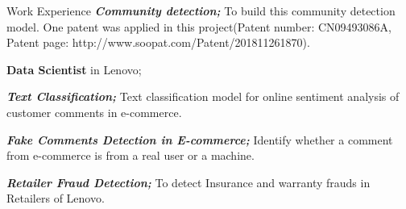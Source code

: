 \begin{rubric}{Work Experience}
    \textbf{\textit{Community detection;}} 
To build this community detection model.
One patent was applied in this project(Patent number: CN09493086A, Patent page: http://www.soopat.com/Patent/201811261870). 

\entry*[2016 -- 2017]%
	\textbf{Data Scientist} in Lenovo; 
	
 \textbf{\textit{Text Classification;}} Text classification model for online sentiment analysis of customer comments in e-commerce. 
 
  \textbf{\textit{Fake Comments Detection in E-commerce;}} Identify whether a comment from e-commerce is from a real user or a machine.
  
 \textbf{\textit{Retailer Fraud Detection;}} To detect Insurance and warranty frauds in Retailers of Lenovo.


    
	

%





    
\end{rubric}